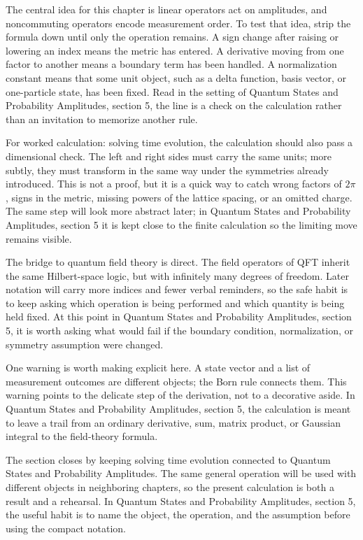 The central idea for this chapter is linear operators act on amplitudes, and noncommuting operators encode measurement order.  To test that idea, strip the formula down until only the operation remains.  A sign change after raising or lowering an index means the metric has entered.  A derivative moving from one factor to another means a boundary term has been handled.  A normalization constant means that some unit object, such as a delta function, basis vector, or one-particle state, has been fixed.  Read in the setting of Quantum States and Probability Amplitudes, section 5, the line is a check on the calculation rather than an invitation to memorize another rule.

For worked calculation: solving time evolution, the calculation should also pass a dimensional check.  The left and right sides must carry the same units; more subtly, they must transform in the same way under the symmetries already introduced.  This is not a proof, but it is a quick way to catch wrong factors of \(2\pi\), signs in the metric, missing powers of the lattice spacing, or an omitted charge.  The same step will look more abstract later; in Quantum States and Probability Amplitudes, section 5 it is kept close to the finite calculation so the limiting move remains visible.

The bridge to quantum field theory is direct.  The field operators of QFT inherit the same Hilbert-space logic, but with infinitely many degrees of freedom.  Later notation will carry more indices and fewer verbal reminders, so the safe habit is to keep asking which operation is being performed and which quantity is being held fixed.  At this point in Quantum States and Probability Amplitudes, section 5, it is worth asking what would fail if the boundary condition, normalization, or symmetry assumption were changed.

One warning is worth making explicit here.  A state vector and a list of measurement outcomes are different objects; the Born rule connects them.  This warning points to the delicate step of the derivation, not to a decorative aside.  In Quantum States and Probability Amplitudes, section 5, the calculation is meant to leave a trail from an ordinary derivative, sum, matrix product, or Gaussian integral to the field-theory formula.

The section closes by keeping solving time evolution connected to Quantum States and Probability Amplitudes.  The same general operation will be used with different objects in neighboring chapters, so the present calculation is both a result and a rehearsal.  In Quantum States and Probability Amplitudes, section 5, the useful habit is to name the object, the operation, and the assumption before using the compact notation.




